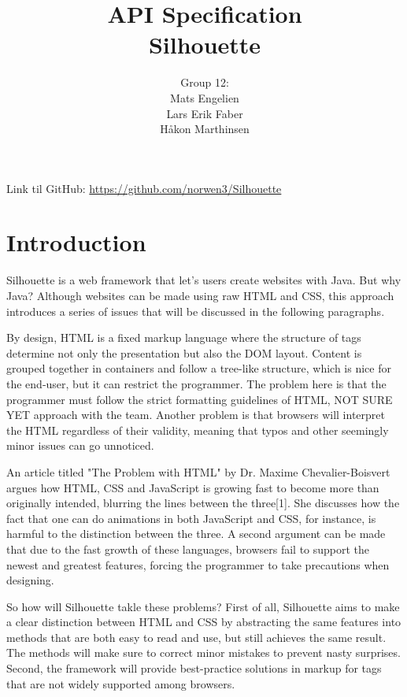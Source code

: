 \documentclass[12pt]{article}
\begin{document}
\title{%
    API Specification\\
    \large Silhouette}
\author{%
    Group 12:\\
    Mats Engelien\\
    Lars Erik Faber\\
    Håkon Marthinsen}
\date{}
\maketitle

\newpage

\tableofcontents

\newpage

Link til GitHub: \href{https://github.com/norwen3/Silhouette}{https://github.com/norwen3/Silhouette}

\section{Introduction}

Silhouette is a web framework that let's users create websites with Java. But why Java? Although websites can be made using raw HTML and CSS, this approach introduces a series of issues that will be discussed in the following paragraphs. 

By design, HTML is a fixed markup language where the structure of tags determine not only the presentation but also the DOM layout. Content is grouped together in containers and follow a tree-like structure, which is nice for the end-user, but it can restrict the programmer. The problem here is that the programmer must follow the strict formatting guidelines of HTML, NOT SURE YET approach with the team. Another problem is that browsers will interpret the HTML regardless of their validity, meaning that typos and other seemingly minor issues can go unnoticed.

An article titled "The Problem with HTML" by Dr. Maxime Chevalier-Boisvert argues how HTML, CSS and JavaScript is growing fast to become more than originally intended, blurring the lines between the three[1]. She discusses how the fact that one can do animations in both JavaScript and CSS, for instance, is harmful to the distinction between the three. A second argument can be made that due to the fast growth of these languages, browsers fail to support the newest and greatest features, forcing the programmer to take precautions when designing.

So how will Silhouette takle these problems? First of all, Silhouette aims to make a clear distinction between HTML and CSS by abstracting the same features into methods that are both easy to read and use, but still achieves the same result. The methods will make sure to correct minor mistakes to prevent nasty surprises. Second, the framework will provide best-practice solutions in markup for tags that are not widely supported among browsers.
\end{document}
